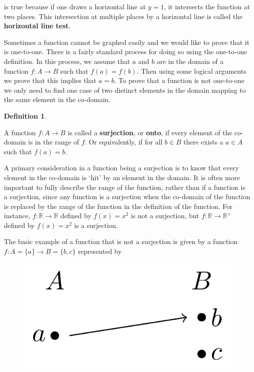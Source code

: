 \documentclass[
]{book}
\theoremstyle{definition}
\newtheorem{definition}{Definition}[chapter]
\theoremstyle{definition}
\theoremstyle{definition}
\theoremstyle{definition}
\theoremstyle{remark}
\begin{document}
is true because if one draws a horizontal line at \(y=1\), it intersects the function at two places. This intersection at multiple places by a horizontal line is called the \textbf{horizontal line test}.

Sometimes a function cannot be graphed easily and we would like to prove that it is one-to-one. There is a fairly standard process for doing so using the one-to-one definition. In this process, we assume that \(a\) and \(b\) are in the domain of a function \(f:A\rightarrow B\) such that \(f(a)=f(b)\). Then using some logical arguments we prove that this implies that \(a=b\). To prove that a function is not one-to-one we only need to find one case of two distinct elements in the domain mapping to the same element in the co-domain.

\begin{definition}
\protect\hypertarget{def:unlabeled-div-63}{}\label{def:unlabeled-div-63}

A function \(f:A\rightarrow B\) is called a \textbf{surjection}, or \textbf{onto}, if every element of the co-domain is in the range of \(f\). Or equivalently, if for all \(b\in B\) there exists a \(a\in A\) such that \(f(a)=b\).

\end{definition}

A primary consideration in a function being a surjection is to know that every element in the co-domain is `hit' by an element in the domain. It is often more important to fully describe the range of the function, rather than if a function is a surjection, since any function is a surjection when the co-domain of the function is replaced by the range of the function in the definition of the function. For instance, \(f:\mathbb{R}\rightarrow \mathbb{R}\) defined by \(f(x)=x^2\) is not a surjection, but \(f:\mathbb{R}\rightarrow \mathbb{R}^+\) defined by \(f(x)=x^2\) is a surjection.

The basic example of a function that is not a surjection is given by a function \(f:A=\{a\} \rightarrow B=\{b,c\}\) represented by

\begin{figure}
 
 {\centering \includegraphics[width=0.3\linewidth]{tikz/example-nonsurjection} 
 
 }
 
 \end{figure}
\end{document}
